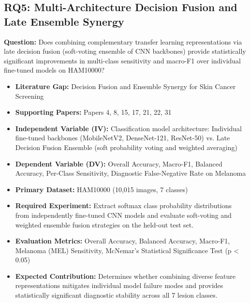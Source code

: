 \documentclass[11pt,a4paper]{article}
\begin{document}
\subsection{RQ5: Multi-Architecture Decision Fusion and Late Ensemble Synergy}
\textbf{Question:} Does combining complementary transfer learning representations via late decision fusion (soft-voting ensemble of CNN backbones) provide statistically significant improvements in multi-class sensitivity and macro-F1 over individual fine-tuned models on HAM10000?
\begin{itemize}
\item \textbf{Literature Gap:} Decision Fusion and Ensemble Synergy for Skin Cancer Screening
\item \textbf{Supporting Papers:} Papers 4, 8, 15, 17, 21, 22, 31
\item \textbf{Independent Variable (IV):} Classification model architecture: Individual fine-tuned backbones (MobileNetV2, DenseNet-121, ResNet-50) vs. Late Decision Fusion Ensemble (soft probability voting and weighted averaging)
\item \textbf{Dependent Variable (DV):} Overall Accuracy, Macro-F1, Balanced Accuracy, Per-Class Sensitivity, Diagnostic False-Negative Rate on Melanoma
\item \textbf{Primary Dataset:} HAM10000 (10,015 images, 7 classes)
\item \textbf{Required Experiment:} Extract softmax class probability distributions from independently fine-tuned CNN models and evaluate soft-voting and weighted ensemble fusion strategies on the held-out test set.
\item \textbf{Evaluation Metrics:} Overall Accuracy, Balanced Accuracy, Macro-F1, Melanoma (MEL) Sensitivity, McNemar's Statistical Significance Test (p < 0.05)
\item \textbf{Expected Contribution:} Determines whether combining diverse feature representations mitigates individual model failure modes and provides statistically significant diagnostic stability across all 7 lesion classes.
\end{itemize}
\end{document}
